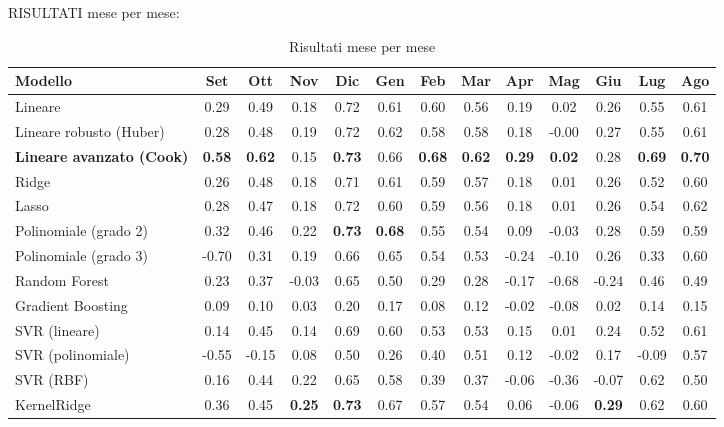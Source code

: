 RISULTATI mese per mese:

\begin{table}[H]
    \tiny
    \centering
    \setlength{\tabcolsep}{4pt}
    \def\arraystretch{1.5}
    \begin{tabular}{|l|c|c|c|c|c|c|c|c|c|c|c|c|}
    \hline
        \textbf{Modello} & \textbf{Set} & \textbf{Ott} & \textbf{Nov} & \textbf{Dic} & \textbf{Gen} & \textbf{Feb} & \textbf{Mar} & \textbf{Apr} & \textbf{Mag} & \textbf{Giu} & \textbf{Lug} & \textbf{Ago} \\ \hline
        Lineare & 0.29 & 0.49 & 0.18 & 0.72 & 0.61 & 0.60 & 0.56 & 0.19 & 0.02 & 0.26 & 0.55 & 0.61 \\ \hline
        Lineare robusto (Huber) & 0.28 & 0.48 & 0.19 & 0.72 & 0.62 & 0.58 & 0.58 & 0.18 & -0.00 & 0.27 & 0.55 & 0.61 \\ \hline
        \textbf{Lineare avanzato (Cook)} & \textbf{0.58} & \textbf{0.62} & 0.15 & \textbf{0.73} & 0.66 & \textbf{0.68} & \textbf{0.62} & \textbf{0.29} & \textbf{0.02} & 0.28 & \textbf{0.69} & \textbf{0.70} \\ \hline
        Ridge & 0.26 & 0.48 & 0.18 & 0.71 & 0.61 & 0.59 & 0.57 & 0.18 & 0.01 & 0.26 & 0.52 & 0.60 \\ \hline
        Lasso & 0.28 & 0.47 & 0.18 & 0.72 & 0.60 & 0.59 & 0.56 & 0.18 & 0.01 & 0.26 & 0.54 & 0.62 \\ \hline
        Polinomiale (grado 2) & 0.32 & 0.46 & 0.22 & \textbf{0.73} & \textbf{0.68} & 0.55 & 0.54 & 0.09 & -0.03 & 0.28 & 0.59 & 0.59 \\ \hline
        Polinomiale (grado 3) & -0.70 & 0.31 & 0.19 & 0.66 & 0.65 & 0.54 & 0.53 & -0.24 & -0.10 & 0.26 & 0.33 & 0.60 \\ \hline
        Random Forest & 0.23 & 0.37 & -0.03 & 0.65 & 0.50 & 0.29 & 0.28 & -0.17 & -0.68 & -0.24 & 0.46 & 0.49 \\ \hline
        Gradient Boosting & 0.09 & 0.10 & 0.03 & 0.20 & 0.17 & 0.08 & 0.12 & -0.02 & -0.08 & 0.02 & 0.14 & 0.15 \\ \hline
        SVR (lineare) & 0.14 & 0.45 & 0.14 & 0.69 & 0.60 & 0.53 & 0.53 & 0.15 & 0.01 & 0.24 & 0.52 & 0.61 \\ \hline
        SVR (polinomiale) & -0.55 & -0.15 & 0.08 & 0.50 & 0.26 & 0.40 & 0.51 & 0.12 & -0.02 & 0.17 & -0.09 & 0.57 \\ \hline
        SVR (RBF) & 0.16 & 0.44 & 0.22 & 0.65 & 0.58 & 0.39 & 0.37 & -0.06 & -0.36 & -0.07 & 0.62 & 0.50 \\ \hline
        KernelRidge & 0.36 & 0.45 & \textbf{0.25} & \textbf{0.73} & 0.67 & 0.57 & 0.54 & 0.06 & -0.06 & \textbf{0.29} & 0.62 & 0.60 \\ \hline
    \end{tabular}
    \caption{Risultati mese per mese}
    \label{fig:risultati-pm2.5-mese}
\end{table}

